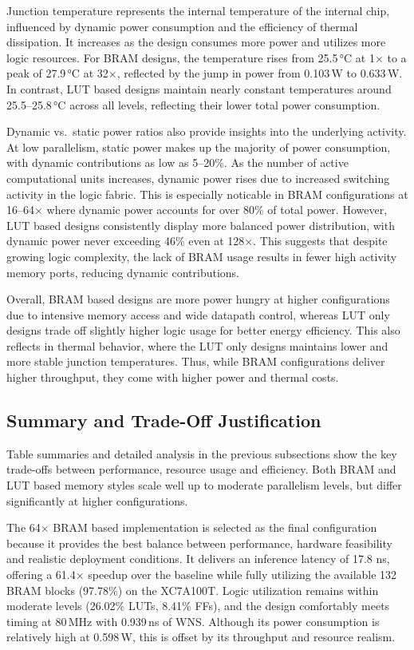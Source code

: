 \documentclass[a4paper,12pt]{report}
\begin{document}
Junction temperature represents the internal temperature of the internal chip, influenced by dynamic power consumption and the efficiency of thermal dissipation. It increases as the design consumes more power and utilizes more logic resources. For BRAM designs, the temperature rises from 25.5\,°C at 1$\times$ to a peak of 27.9\,°C at 32$\times$, reflected by the jump in power from 0.103\,W to 0.633\,W. In contrast, LUT based designs maintain nearly constant temperatures around 25.5–25.8\,°C across all levels, reflecting their lower total power consumption.

Dynamic vs.\ static power ratios also provide insights into the underlying activity. At low parallelism, static power makes up the majority of power consumption, with dynamic contributions as low as 5–20\%. As the number of active computational units increases, dynamic power rises due to increased switching activity in the logic fabric. This is especially noticable in BRAM configurations at 16–64$\times$ where dynamic power accounts for over 80\% of total power. However, LUT based designs consistently display more balanced power distribution, with dynamic power never exceeding 46\% even at 128$\times$. This suggests that despite growing logic complexity, the lack of BRAM usage results in fewer high activity memory ports, reducing dynamic contributions.

Overall, BRAM based designs are more power hungry at higher configurations due to intensive memory access and wide datapath control, whereas LUT only designs trade off slightly higher logic usage for better energy efficiency. This also reflects in thermal behavior, where the LUT only designs maintains lower and more stable junction temperatures. Thus, while BRAM configurations deliver higher throughput, they come with higher power and thermal costs.

\clearpage
\subsection{Summary and Trade-Off Justification}
Table summaries and detailed analysis in the previous subsections show the key trade-offs between performance, resource usage and efficiency. Both BRAM and LUT based memory styles scale well up to moderate parallelism levels, but differ significantly at higher configurations.

The 64$\times$ BRAM based implementation is selected as the final configuration because it provides the best balance between performance, hardware feasibility and realistic deployment conditions. It delivers an inference latency of 17.8 ns, offering a 61.4$\times$ speedup over the baseline while fully utilizing the available 132 BRAM blocks (97.78\%) on the XC7A100T. Logic utilization remains within moderate levels (26.02\% LUTs, 8.41\% FFs), and the design comfortably meets timing at 80\,MHz with 0.939\,ns of WNS. Although its power consumption is relatively high at 0.598\,W, this is offset by its throughput and resource realism.
\end{document}
